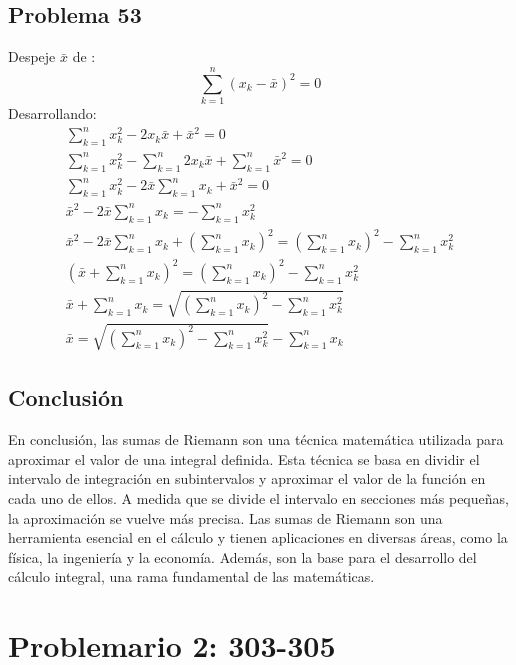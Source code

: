\documentclass{article}
\begin{document}
\subsection{Problema 53}
Despeje \(\bar{x}\) de :
\begin{equation}
  \sum_{k=1}^{n}(x_k-\bar{x})^2 = 0
\end{equation}
Desarrollando:
\begin{align*}
  \sum_{k=1}^{n}x^2_k - 2x_k\bar{x} + \bar{x}^2=0 \\ \sum_{k=1}^{n}x^2_k -\sum_{k=1}^{n} 2x_k\bar{x} + \sum_{k=1}^{n} \bar{x}^2 = 0 \\ \sum_{k=1}^{n} x^2_k -2\bar{x}\sum_{k=1}^{n}x_k + \bar{x}^2=0 \\ \bar{x}^2-2\bar{x}\sum_{k=1}^{n}x_k = -\sum_{k=1}^{n} x^2_k \\ \bar{x}^2-2\bar{x}\sum_{k=1}^{n}x_k + \left(\sum_{k=1}^{n} x_k\right)^2 = \left(\sum_{k=1}^{n} x_k\right)^2 -\sum_{k=1}^{n} x^2_k \\ \left(\bar{x} + \sum_{k=1}^{n} x_k \right)^2 = \left(\sum_{k=1}^{n} x_k\right)^2 -\sum_{k=1}^{n} x^2_k \\ \bar{x} + \sum_{k=1}^{n} x_k = \sqrt{\left(\sum_{k=1}^{n} x_k\right)^2 -\sum_{k=1}^{n} x^2_k} \\ \bar{x} = \sqrt{\left(\sum_{k=1}^{n} x_k\right)^2 -\sum_{k=1}^{n} x^2_k} - \sum_{k=1}^{n} x_k
\end{align*}
\subsection{Conclusión}
En conclusión, las sumas de Riemann son una técnica matemática utilizada para aproximar el valor de una integral definida. Esta técnica se basa en dividir el intervalo de integración en subintervalos y aproximar el valor de la función en cada uno de ellos. A medida que se divide el intervalo en secciones más pequeñas, la aproximación se vuelve más precisa. Las sumas de Riemann son una herramienta esencial en el cálculo y tienen aplicaciones en diversas áreas, como la física, la ingeniería y la economía. Además, son la base para el desarrollo del cálculo integral, una rama fundamental de las matemáticas.
\section{Problemario 2: 303-305}
\end{document}
